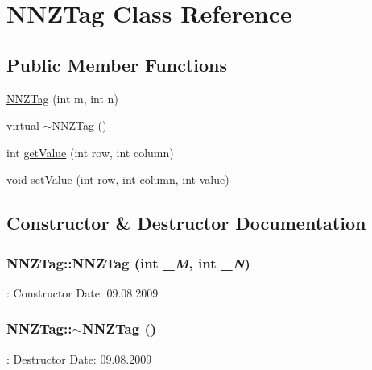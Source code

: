 \hypertarget{classNNZTag}{
\section{NNZTag Class Reference}
\label{classNNZTag}
}
\subsection*{Public Member Functions}
\begin{DoxyCompactItemize}
\item 
\hyperlink{classNNZTag_ad06478eaa480ac4b33390782efa7d8b9}{NNZTag} (int m, int n)
\item 
virtual \hyperlink{classNNZTag_ac7a5b8cb937bc062d605a37dbcee62be}{$\sim$NNZTag} ()
\item 
int \hyperlink{classNNZTag_ab93956ff16797fdb7c1e55eeb2e3549c}{getValue} (int row, int column)
\item 
void \hyperlink{classNNZTag_a88006fcd4a4d2386c16f196c2cc2b08c}{setValue} (int row, int column, int value)
\end{DoxyCompactItemize}


\subsection{Constructor \& Destructor Documentation}
\hypertarget{classNNZTag_ad06478eaa480ac4b33390782efa7d8b9}{
\subsubsection[{NNZTag}]{\setlength{\rightskip}{0pt plus 5cm}NNZTag::NNZTag (int {\em \_\-M}, \/  int {\em \_\-N})}}
\label{classNNZTag_ad06478eaa480ac4b33390782efa7d8b9}
: Constructor  Date: 09.08.2009 \hypertarget{classNNZTag_ac7a5b8cb937bc062d605a37dbcee62be}{
\subsubsection[{$\sim$NNZTag}]{\setlength{\rightskip}{0pt plus 5cm}NNZTag::$\sim$NNZTag ()}}
\label{classNNZTag_ac7a5b8cb937bc062d605a37dbcee62be}
: Destructor  Date: 09.08.2009 

